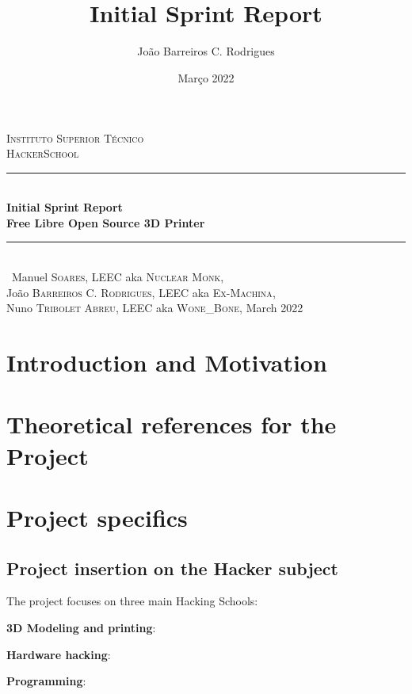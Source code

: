 \documentclass[a4paper,12pt]{article}
\date{Março 2022}
\title{ \\ \large {Initial Sprint Report}}
\author{João Barreiros C. Rodrigues}
\begin{document}
	\begin{titlepage} %
        \newcommand{\HRule}{\rule{\linewidth}{0.5mm}} %
        \center %
        \textsc{\LARGE Instituto Superior Técnico}\\[1.5cm] %
	\textsc{\Large HackerSchool}\\[0.25cm]
        \HRule\\[0.4cm]
        {\LARGE\bfseries Initial Sprint Report}\\[0.4cm] %
	{\huge\bfseries Free Libre Open Source 3D Printer}\\[0.4cm] %
        \HRule\\[1.5cm]\
	Manuel \textsc{Soares}, LEEC aka \textsc{Nuclear Monk},\\
        João \textsc{Barreiros C. Rodrigues}, LEEC aka \textsc{Ex-Machina},\\
	Nuno \textsc{Tribolet Abreu}, LEEC aka \textsc{Wone\_Bone},
        \vfill\vfill\vfill %
        {\large March 2022} %
        \vfill %
\end{titlepage}
	\newpage
		\tableofcontents
	\section{Introduction and Motivation}
	
	\section{Theoretical references for the Project}
	\clearpage	
	\section{Project specifics}
		
		\subsection{Project insertion on the Hacker subject}
		The project focuses on three main Hacking Schools: \par
		\textbf{3D Modeling and printing}:\par
		\textbf{Hardware hacking}:\par
		\textbf{Programming}:
		
\end{document}
